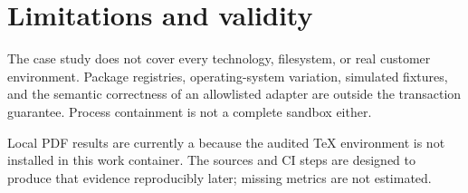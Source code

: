 \section{Limitations and validity}
\label{chap:limitations-validity}

The case study does not cover every technology, filesystem, or real customer environment.
Package registries, operating-system variation, simulated fixtures, and the semantic
correctness of an allowlisted adapter are outside the transaction guarantee. Process
containment is not a complete sandbox either.

Local PDF results are currently a \Limitation{} because the audited TeX environment is
not installed in this work container. The sources and CI steps are designed to produce
that evidence reproducibly later; missing metrics are not estimated.
